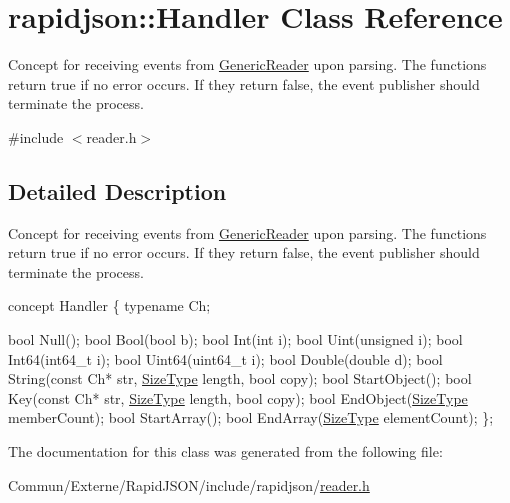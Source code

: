 \hypertarget{classrapidjson_1_1_handler}{}\section{rapidjson\+:\+:Handler Class Reference}
\label{classrapidjson_1_1_handler}


Concept for receiving events from \hyperlink{class_generic_reader}{Generic\+Reader} upon parsing. The functions return true if no error occurs. If they return false, the event publisher should terminate the process.  




{\ttfamily \#include $<$reader.\+h$>$}



\subsection{Detailed Description}
Concept for receiving events from \hyperlink{class_generic_reader}{Generic\+Reader} upon parsing. The functions return true if no error occurs. If they return false, the event publisher should terminate the process. 


\begin{DoxyCode}
concept Handler \{
    \textcolor{keyword}{typename} Ch;

    \textcolor{keywordtype}{bool} Null();
    \textcolor{keywordtype}{bool} Bool(\textcolor{keywordtype}{bool} b);
    \textcolor{keywordtype}{bool} Int(\textcolor{keywordtype}{int} i);
    \textcolor{keywordtype}{bool} Uint(\textcolor{keywordtype}{unsigned} i);
    \textcolor{keywordtype}{bool} Int64(int64\_t i);
    \textcolor{keywordtype}{bool} Uint64(uint64\_t i);
    \textcolor{keywordtype}{bool} Double(\textcolor{keywordtype}{double} d);
    \textcolor{keywordtype}{bool} String(\textcolor{keyword}{const} Ch* str, \hyperlink{rapidjson_8h_a5ed6e6e67250fadbd041127e6386dcb5}{SizeType} length, \textcolor{keywordtype}{bool} copy);
    \textcolor{keywordtype}{bool} StartObject();
    \textcolor{keywordtype}{bool} Key(\textcolor{keyword}{const} Ch* str, \hyperlink{rapidjson_8h_a5ed6e6e67250fadbd041127e6386dcb5}{SizeType} length, \textcolor{keywordtype}{bool} copy);
    \textcolor{keywordtype}{bool} EndObject(\hyperlink{rapidjson_8h_a5ed6e6e67250fadbd041127e6386dcb5}{SizeType} memberCount);
    \textcolor{keywordtype}{bool} StartArray();
    \textcolor{keywordtype}{bool} EndArray(\hyperlink{rapidjson_8h_a5ed6e6e67250fadbd041127e6386dcb5}{SizeType} elementCount);
\};
\end{DoxyCode}
 

The documentation for this class was generated from the following file\+:\begin{DoxyCompactItemize}
\item 
Commun/\+Externe/\+Rapid\+J\+S\+O\+N/include/rapidjson/\hyperlink{reader_8h}{reader.\+h}\end{DoxyCompactItemize}
